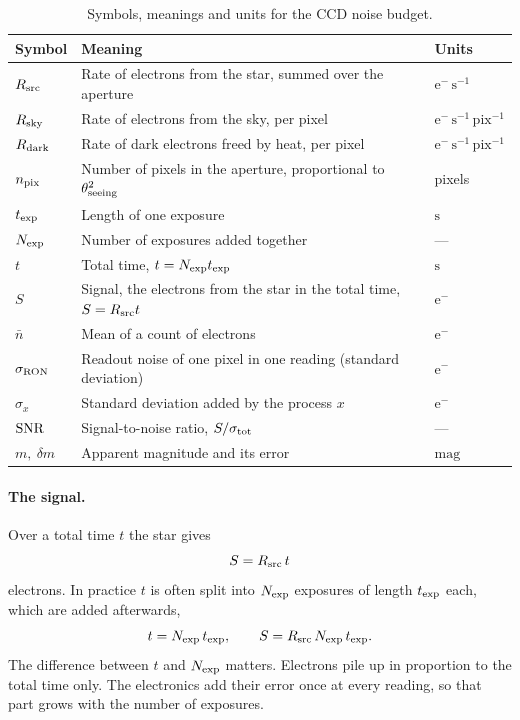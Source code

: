 \begin{table}[htbp]
	\centering
	\begin{tabular}{@{}l p{9.8cm} l@{}}
		\toprule
		\textbf{Symbol} & \textbf{Meaning} & \textbf{Units} \\
		\midrule
		$R_{\rm src}$ & Rate of electrons from the star, summed over the aperture & $\mathrm{e^-\,s^{-1}}$ \\
		$R_{\rm sky}$ & Rate of electrons from the sky, per pixel & $\mathrm{e^-\,s^{-1}\,pix^{-1}}$ \\
		$R_{\rm dark}$ & Rate of dark electrons freed by heat, per pixel & $\mathrm{e^-\,s^{-1}\,pix^{-1}}$ \\
		$n_{\rm pix}$ & Number of pixels in the aperture, proportional to $\theta_{\rm seeing}^2$ & pixels \\
		$t_{\rm exp}$ & Length of one exposure & $\mathrm{s}$ \\
		$N_{\rm exp}$ & Number of exposures added together & --- \\
		$t$ & Total time, $t = N_{\rm exp}t_{\rm exp}$ & $\mathrm{s}$ \\
		$S$ & Signal, the electrons from the star in the total time, $S = R_{\rm src}t$ & $\mathrm{e^-}$ \\
		$\bar n$ & Mean of a count of electrons & $\mathrm{e^-}$ \\
		$\sigma_{\rm RON}$ & Readout noise of one pixel in one reading (standard deviation) & $\mathrm{e^-}$ \\
		$\sigma_x$ & Standard deviation added by the process $x$ & $\mathrm{e^-}$ \\
		$\mathrm{SNR}$ & Signal-to-noise ratio, $S/\sigma_{\rm tot}$ & --- \\
		$m,\ \delta m$ & Apparent magnitude and its error & $\mathrm{mag}$ \\
		\bottomrule
	\end{tabular}
	\caption{Symbols, meanings and units for the CCD noise budget.}
	\label{tab:ccd_notation}
\end{table}

\paragraph{The signal.} Over a total time $t$ the star gives
\begin{equation}
	S = R_{\rm src}\,t
	\label{eq:ccd_signal_total}
\end{equation}
electrons. In practice $t$ is often split into $N_{\rm exp}$ exposures of length $t_{\rm exp}$ each, which are added afterwards,
\begin{equation}
	t = N_{\rm exp}\,t_{\rm exp}, \qquad S = R_{\rm src}\,N_{\rm exp}\,t_{\rm exp}.
	\label{eq:ccd_signal_partition}
\end{equation}
The difference between $t$ and $N_{\rm exp}$ matters. Electrons pile up in proportion to the total time only. The electronics add their error once at every reading, so that part grows with the number of exposures.

